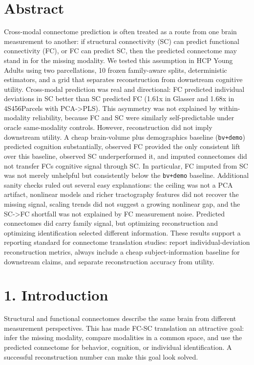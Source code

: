 \section{Abstract}\label{abstract}

Cross-modal connectome prediction is often treated as a route from one brain measurement to another: if structural connectivity (SC) can predict functional connectivity (FC), or FC can predict SC, then the predicted connectome may stand in for the missing modality. We tested this assumption in HCP Young Adults using two parcellations, 10 frozen family-aware splits, deterministic estimators, and a grid that separates reconstruction from downstream cognitive utility. Cross-modal prediction was real and directional: FC predicted individual deviations in SC better than SC predicted FC (1.61x in Glasser and 1.68x in 4S456Parcels with PCA-\textgreater PLS). This asymmetry was not explained by within-modality reliability, because FC and SC were similarly self-predictable under oracle same-modality controls. However, reconstruction did not imply downstream utility. A cheap brain-volume plus demographics baseline (\texttt{bv+demo}) predicted cognition substantially, observed FC provided the only consistent lift over this baseline, observed SC underperformed it, and imputed connectomes did not transfer FC\textquotesingle s cognitive signal through SC. In particular, FC imputed from SC was not merely unhelpful but consistently below the \texttt{bv+demo} baseline. Additional sanity checks ruled out several easy explanations: the ceiling was not a PCA artifact, nonlinear models and richer tractography features did not recover the missing signal, scaling trends did not suggest a growing nonlinear gap, and the SC-\textgreater FC shortfall was not explained by FC measurement noise. Predicted connectomes did carry family signal, but optimizing reconstruction and optimizing identification selected different information. These results support a reporting standard for connectome translation studies: report individual-deviation reconstruction metrics, always include a cheap subject-information baseline for downstream claims, and separate reconstruction accuracy from utility.

\section{1. Introduction}\label{1-introduction}

Structural and functional connectomes describe the same brain from different measurement perspectives. This has made FC-SC translation an attractive goal: infer the missing modality, compare modalities in a common space, and use the predicted connectome for behavior, cognition, or individual identification. A successful reconstruction number can make this goal look solved.

